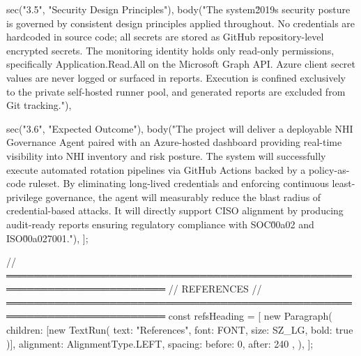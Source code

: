   sec("3.5", "Security Design Principles"),
  body("The system\u2019s security posture is governed by consistent design principles applied throughout. No credentials are hardcoded in source code; all secrets are stored as GitHub repository-level encrypted secrets. The monitoring identity holds only read-only permissions, specifically Application.Read.All on the Microsoft Graph API. Azure client secret values are never logged or surfaced in reports. Execution is confined exclusively to the private self-hosted runner pool, and generated reports are excluded from Git tracking."),

  sec("3.6", "Expected Outcome"),
  body("The project will deliver a deployable NHI Governance Agent paired with an Azure-hosted dashboard providing real-time visibility into NHI inventory and risk posture. The system will successfully execute automated rotation pipelines via GitHub Actions backed by a policy-as-code ruleset. By eliminating long-lived credentials and enforcing continuous least-privilege governance, the agent will measurably reduce the blast radius of credential-based attacks. It will directly support CISO alignment by producing audit-ready reports ensuring regulatory compliance with SOC\u00a02 and ISO\u00a027001."),
];

// ═════════════════════════════════════════════════════════════════════════
//  REFERENCES
// ═════════════════════════════════════════════════════════════════════════
const refsHeading = [
  new Paragraph({
    children: [new TextRun({ text: "References", font: FONT, size: SZ_LG, bold: true })],
    alignment: AlignmentType.LEFT,
    spacing: { before: 0, after: 240 },
  }),
];

